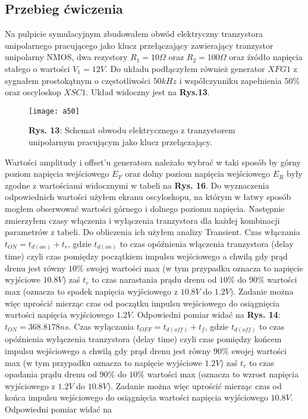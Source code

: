 \documentclass[11pt]{article}
\begin{document}
\subsection{Przebieg ćwiczenia}
Na pulpicie symulacyjnym zbudowałem obwód elektryczny tranzystora unipolarnego pracującego jako klucz przełączający zawierający tranzystor unipolarny NMOS, dwa rezystory $R_1=10\Omega$ oraz $R_2=100\Omega$ oraz źródło napięcia stałego
o wartości $V_1=12V$. Do układu podłączyłem również generator $XFG1$ z sygnałem prostokątnym o częstotliwości $50kHz$ i współczynniku zapełnienia $50\%$ oraz oscyloskop $XSC1$. Układ widoczny jest na \textbf{Rys.13}.
\begin{figure}[H]
\centering
\texttt{[image: a50]}
\caption*{\textbf{Rys. 13}: Schemat obwodu elektrycznego z tranzystorem unipolarnym pracującym jako klucz przełączający. }
\end{figure}
\noindent Wartości amplitudy i offset'u generatora należało wybrać w taki sposób by górny poziom napięcia wejściowego $E_F$ oraz dolny poziom napięcia wejściowego $E_R$ były zgodne z wartościami widocznymi w tabeli na \textbf{Rys. 16}. Do wyznaczenia
odpowiednich wartości użyłem ekranu oscyloskopu, na którym w łatwy sposób mogłem obserwować wartości górnego i dolnego poziomu napięcia. \newline
Następnie zmierzyłem czasy włączenia i wyłączenia tranzystora dla każdej kombinacji parametrów z tabeli. Do obliczenia ich użyłem analizy Transient. Czas włączania $t_{ON} = t_{d(on)}+t_r$, gdzie $t_{d(on)}$ to czas opóźnienia włączenia tranzystora
(delay time) czyli czas pomiędzy początkiem impulsu wejściowego a chwilą gdy prąd drenu jest równy $10\%$ swojej wartości max (w tym przypadku oznacza to napięcie wyjściowe $10.8V$) zaś $t_r$ to czas narastania prądu drenu od $10\%$ do
 $90\%$ wartości max (oznacza to spadek napięcia wyjściowego z $10.8V$ do $1.2V$). Zadanie można więc uprościć mierząc czas od początku impulsu wejściowego do osiągnięcia wartości napięcia wyjściowego $1.2V$. Odpowiedni pomiar widać na
\textbf{Rys. 14}: $t_{ON} = 368.8178ns$. Czas wyłączania $t_{OFF} = t_{d(off)}+t_f$, gdzie $t_{d(off)}$ to czas opóźnienia wyłączenia tranzystora
(delay time) czyli czas pomiędzy końcem impulsu wejściowego a chwilą gdy prąd drenu jest równy $90\%$ swojej wartości max (w tym przypadku oznacza to napięcie wyjściowe $1.2V$) zaś $t_r$ to czas opadania prądu drenu od $90\%$ do $10\%$ wartości max (oznacza to wzrost napięcia wyjściowego z $1.2V$ do $10.8V$). Zadanie można więc uprościć mierząc czas od końca impulsu wejściowego do osiągnięcia wartości napięcia wyjściowego $10.8V$. Odpowiedni pomiar widać na
\end{document}
